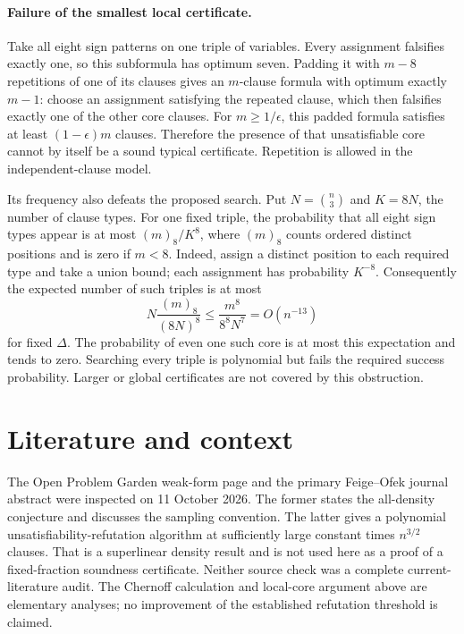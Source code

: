 \documentclass[11pt]{article}
\begin{document}
\paragraph{Failure of the smallest local certificate.}
Take all eight sign patterns on one triple of variables. Every assignment falsifies exactly one, so this subformula has optimum seven. Padding it with $m-8$ repetitions of one of its clauses gives an $m$-clause formula with optimum exactly $m-1$: choose an assignment satisfying the repeated clause, which then falsifies exactly one of the other core clauses. For $m\ge1/\epsilon$, this padded formula satisfies at least $(1-\epsilon)m$ clauses. Therefore the presence of that unsatisfiable core cannot by itself be a sound typical certificate. Repetition is allowed in the independent-clause model.

Its frequency also defeats the proposed search. Put $N=\binom n3$ and $K=8N$, the number of clause types. For one fixed triple, the probability that all eight sign types appear is at most $(m)_8/K^8$, where $(m)_8$ counts ordered distinct positions and is zero if $m<8$. Indeed, assign a distinct position to each required type and take a union bound; each assignment has probability $K^{-8}$. Consequently the expected number of such triples is at most
\[
 N\frac{(m)_8}{(8N)^8}\le \frac{m^8}{8^8N^7}=O(n^{-13})
\]
for fixed $\Delta$. The probability of even one such core is at most this expectation and tends to zero. Searching every triple is polynomial but fails the required success probability. Larger or global certificates are not covered by this obstruction.

\section{Literature and context}
The Open Problem Garden weak-form page and the primary Feige--Ofek journal abstract were inspected on 11 October 2026. The former states the all-density conjecture and discusses the sampling convention. The latter gives a polynomial unsatisfiability-refutation algorithm at sufficiently large constant times $n^{3/2}$ clauses. That is a superlinear density result and is not used here as a proof of a fixed-fraction soundness certificate. Neither source check was a complete current-literature audit. The Chernoff calculation and local-core argument above are elementary analyses; no improvement of the established refutation threshold is claimed.
\end{document}
